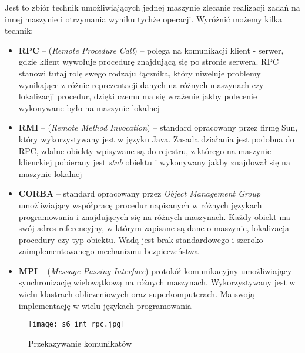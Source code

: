 Jest to zbiór technik umożliwiających jednej maszynie zlecanie realizacji zadań na innej maszynie i otrzymania wyniku tychże operacji. Wyróżnić możemy kilka technik:
\begin{itemize}
	\item \textbf{RPC} -- (\textit{Remote Procedure Call}) -- polega na komunikacji klient - serwer, gdzie klient wywołuje procedurę znajdującą się po stronie serwera. RPC stanowi tutaj rolę swego rodzaju łącznika, który niweluje problemy wynikające z różnic reprezentacji danych na różnych maszynach czy lokalizacji procedur, dzięki czemu ma się wrażenie jakby polecenie wykonywane było na maszynie lokalnej
    \item \textbf{RMI} -- (\textit{Remote Method Invocation}) -- standard opracowany przez firmę Sun, który wykorzystywany jest w języku Java. Zasada działania jest podobna do RPC, zdalne obiekty wpisywane są do rejestru, z którego na maszynie klienckiej pobierany jest \textit{stub} obiektu i wykonywany jakby znajdował się na maszynie lokalnej
    \item \textbf{CORBA} -- standard opracowany przez \textit{Object Management Group} umożliwiający współpracę procedur napisanych w różnych językach programowania i znajdujących się na różnych maszynach. Każdy obiekt ma swój adres referencyjny, w którym zapisane są dane o maszynie, lokalizacja procedury czy typ obiektu. Wadą jest brak standardowego i szeroko zaimplementowanego mechanizmu bezpieczeństwa
    \item \textbf{MPI} -- (\textit{Message Passing Interface}) protokół komunikacyjny umożliwiający synchronizację wielowątkową na różnych maszynach. Wykorzystywany jest w wielu klastrach obliczeniowych oraz superkomputerach. Ma swoją implementację w wielu językach programowania
\end{itemize}

\begin{figure}[!h]
\centering
\texttt{[image: s6\_int\_rpc.jpg]}
\caption{Przekazywanie komunikatów}
\end{figure}